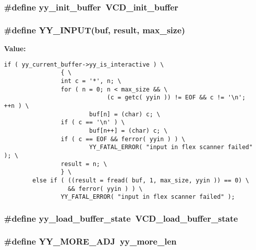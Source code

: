 \subsubsection{\setlength{\rightskip}{0pt plus 5cm}\#define yy\_\-init\_\-buffer\ VCD\_\-init\_\-buffer}\label{vcd__lexer_8c_a6}


\subsubsection{\setlength{\rightskip}{0pt plus 5cm}\#define YY\_\-INPUT(buf, result, max\_\-size)}\label{vcd__lexer_8c_a63}


{\bf Value:}

\footnotesize\begin{verbatim}if ( yy_current_buffer->yy_is_interactive ) \
                { \
                int c = '*', n; \
                for ( n = 0; n < max_size && \
                             (c = getc( yyin )) != EOF && c != '\n'; ++n ) \
                        buf[n] = (char) c; \
                if ( c == '\n' ) \
                        buf[n++] = (char) c; \
                if ( c == EOF && ferror( yyin ) ) \
                        YY_FATAL_ERROR( "input in flex scanner failed" ); \
                result = n; \
                } \
        else if ( ((result = fread( buf, 1, max_size, yyin )) == 0) \
                  && ferror( yyin ) ) \
                YY_FATAL_ERROR( "input in flex scanner failed" );\end{verbatim}\normalsize 
{}
\subsubsection{\setlength{\rightskip}{0pt plus 5cm}\#define yy\_\-load\_\-buffer\_\-state\ VCD\_\-load\_\-buffer\_\-state}\label{vcd__lexer_8c_a8}


\subsubsection{\setlength{\rightskip}{0pt plus 5cm}\#define YY\_\-MORE\_\-ADJ\ {\bf yy\_\-more\_\-len}}\label{vcd__lexer_8c_a51}


